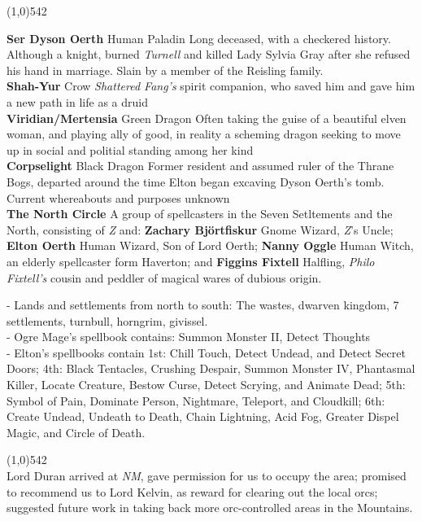 \documentclass[letterpaper]{article}
\newcommand{\fullline}{\noindent\line(1,0){542} \\}
\newcommand{\person}[3]{\noindent\textbf{#1
    \ifstrequal{#2}{M}{{\color{ProcessBlue}\male}}{%
    \ifstrequal{#2}{F}{\color{VioletRed}\female}{}}}{\scriptsize #3}}
\begin{document}
\vspace{-1.75em}
\fullline
\vspace{-1.5em}

\person{Ser Dyson Oerth}{M}{Human Paladin} Long deceased, with a checkered history. Although a knight, burned \emph{Turnell} and killed Lady Sylvia Gray after she refused his hand in marriage. Slain by a member of the Reisling family.\\
\person{Shah-Yur}{M}{Crow} \emph{Shattered Fang's} spirit companion, who saved him and gave him a new path in life as a druid\\
\person{Viridian/Mertensia}{F}{Green Dragon} Often taking the guise of a beautiful elven woman, and playing ally of good, in reality a scheming dragon seeking to move up in social and politial standing among her kind \\
\person{Corpselight}{F}{Black Dragon} Former resident and assumed ruler of the Thrane Bogs, departed around the time Elton began excaving Dyson Oerth's tomb. Current whereabouts and purposes unknown \\
\noindent\textbf{The North Circle} A group of spellcasters in the Seven Setltements and the North, consisting of \emph{Z} and: \person{Zachary Bj\"{o}rtfiskur}{M}{Gnome Wizard}, \emph{Z}'s Uncle; \person{Elton Oerth}{M}{Human Wizard}, Son of Lord Oerth; \person{Nanny Oggle}{F}{Human Witch}, an elderly spellcaster form Haverton; and \person{Figgins Fixtell}{M}{Halfling}, \emph{Philo Fixtell's} cousin and peddler of magical wares of dubious origin. \\

\pagebreak

\noindent - Lands and settlements from north to south: The wastes, dwarven kingdom, 7 settlements, turnbull, horngrim, givissel.\\
\noindent - Ogre Mage's spellbook contains: Summon Monster II, Detect Thoughts\\
\noindent - Elton's spellbooks contain 1st: Chill Touch, Detect Undead, and Detect Secret Doors; 4th: Black Tentacles, Crushing Despair, Summon Monster IV, Phantasmal Killer, Locate Creature, Bestow Curse, Detect Scrying, and Animate Dead; 5th: Symbol of Pain, Dominate Person, Nightmare, Teleport, and Cloudkill; 6th: Create Undead, Undeath to Death, Chain Lightning, Acid Fog, Greater Dispel Magic, and Circle of Death.

\vspace{-0.75em}
\fullline
\noindent Lord Duran arrived at \emph{NM}, gave permission for us to occupy the area; promised to recommend us to Lord Kelvin, as reward for clearing out the local orcs; suggested future work in taking back more orc-controlled areas in the Mountains. \\
\end{document}
